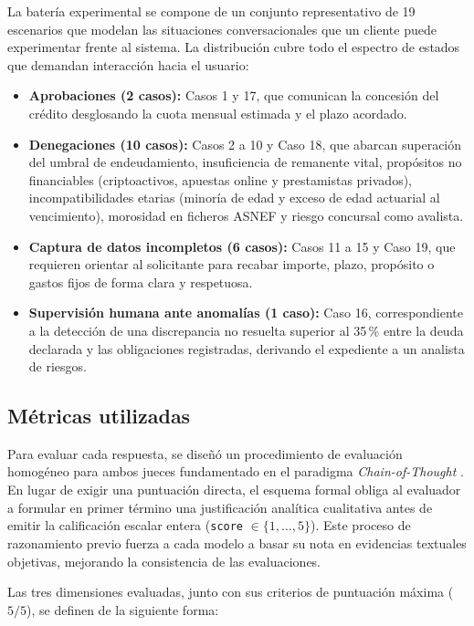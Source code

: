\documentclass[12pt,a4paper]{report}
\begin{document}
La batería experimental se compone de un conjunto representativo de 19 escenarios que modelan las situaciones conversacionales que un cliente puede experimentar frente al sistema. La distribución cubre todo el espectro de estados que demandan interacción hacia el usuario:
\begin{itemize}
    \item \textbf{Aprobaciones (2 casos):} Casos 1 y 17, que comunican la concesión del crédito desglosando la cuota mensual estimada y el plazo acordado.
    \item \textbf{Denegaciones (10 casos):} Casos 2 a 10 y Caso 18, que abarcan superación del umbral de endeudamiento, insuficiencia de remanente vital, propósitos no financiables (criptoactivos, apuestas online y prestamistas privados), incompatibilidades etarias (minoría de edad y exceso de edad actuarial al vencimiento), morosidad en ficheros ASNEF y riesgo concursal como avalista.
    \item \textbf{Captura de datos incompletos (6 casos):} Casos 11 a 15 y Caso 19, que requieren orientar al solicitante para recabar importe, plazo, propósito o gastos fijos de forma clara y respetuosa.
    \item \textbf{Supervisión humana ante anomalías (1 caso):} Caso 16, correspondiente a la detección de una discrepancia no resuelta superior al 35\,\% entre la deuda declarada y las obligaciones registradas, derivando el expediente a un analista de riesgos.
\end{itemize}

\subsection{Métricas utilizadas}

Para evaluar cada respuesta, se diseñó un procedimiento de evaluación homogéneo para ambos jueces fundamentado en el paradigma \textit{Chain-of-Thought} \cite{wei2022chain}. En lugar de exigir una puntuación directa, el esquema formal obliga al evaluador a formular en primer término una justificación analítica cualitativa antes de emitir la calificación escalar entera (\texttt{score} $\in \{1, \dots, 5\}$). Este proceso de razonamiento previo fuerza a cada modelo a basar su nota en evidencias textuales objetivas, mejorando la consistencia de las evaluaciones.

Las tres dimensiones evaluadas, junto con sus criterios de puntuación máxima ($5/5$), se definen de la siguiente forma:
\end{document}
